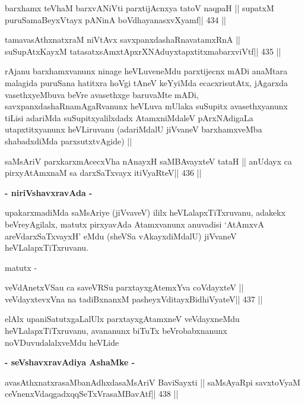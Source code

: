 \begin{shl}
barxhamx teV\s haM barxvANiVti parxtijAcnxya tatoV naqpaH ||
supatxM puruSamaBeyxVtayx pANinA boVdhayanasxvXyamf\hfill || 434 ||
\end{shl}

\begin{shl}
tamavasAthxnatxraM niVtAvx savxpanxdashaRnavatamxRnA ||
suSupAtxKayxM tatasatxsAmxtApxrXNAduyxtapxtitxmabarxviVtf\hfill || 435 ||
\end{shl}

\begin{artha}
rAjanu barxhamxvanunx ninage heVLuveneMdu parxtijecnx mADi anaMtara
malagida puruSana hatitxra hoVgi tAneV keYyiMda ecacxrisutAtx,
jAgarxda vasethxyeMbuva beVre avasethxge baruvaMte mADi,
savxpanxdashaRnamAgaRvanunx heVLuva mUlaka suSupitx avasethxyanunx
tiLisi adariMda suSupitxyalilxdadx AtamxniMdaleV pArxNAdigaLa
utapxtitxyanunx heVLiruvanu (adariMdalU jiVvaneV barxhamxveMba
shabadxdiMda parxsutxtvAgide) ||
\end{artha}

\begin{shl}
saMsAriV parxkarxmAcecxVha nAnayxH saMBAvayxteV tataH ||
anUdayx ca pirxyAtAmxnaM sa darxSaTxvayx itiVyaRteV\hfill || 436 ||
\end{shl}

\medskip
\centerline{{\textbf{- niriVshavxravAda -}}}

\begin{artha}
upakarxmadiMda saMsAriye (jiVvaveV) ililx heVLalapxTiTxruvanu, adakekx
beVreyAgilalx, matutx pirxyavAda Atamxvanunx anuvadisi `AtAmxvA
areVdarxSaTxvayxH' eMdu (sheVSa vAkayxdiMdalU) jiVvaneV
heVLalapxTiTxruvanu.

matutx -
\end{artha}

\begin{shl}
veVdAnetxVSau ca saveVRSu parxtayxgAtemxYva coVdayxteV ||
veVdayxtevxVna na tadiBxnanxM pasheyxVditayxBidhiVyateV\hfill || 437 ||
\end{shl}

\begin{artha}
elAlx upaniSatutxgaLalUlx parxtayxgAtamxneV veVdayxneMdu
heVLalapxTiTxruvanu, avananunx biTuTx beVrobabxnanunx
noVDuvudalalxveMdu heVLide
\end{artha}

\medskip
\centerline{\textbf{- seVshavxravAdiya AshaMke -}}

\begin{shl}
avasAthxnatxrasaMbanAdhxdasaMsAriV BaviSayxti ||
saMsAyaRpi savxtoV\s yaM ceVnenxVdaqgadxqqSeTxVrasaMBavAtf\hfill || 438 ||
\end{shl}

